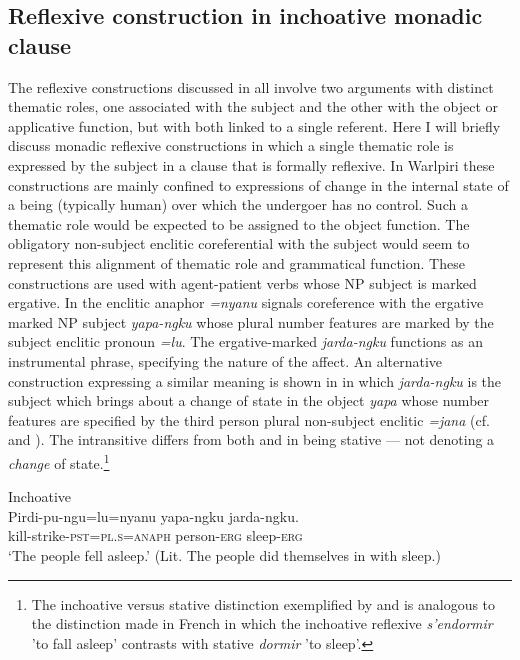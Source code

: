 \documentclass[output=paper]{../langscibook}
\begin{document}
\subsection{Reflexive construction in inchoative monadic clause}\label{sec:laughren:6.2}

The reflexive constructions discussed in  all involve two arguments with distinct thematic roles, one associated with the subject and the other with the object or applicative function, but with both linked to a single referent. Here I will briefly discuss monadic reflexive constructions in which a single thematic role is expressed by the subject in a clause that is formally reflexive. In Warlpiri these constructions are mainly confined to expressions of change in the internal state of a being (typically human) over which the undergoer has no control. Such a thematic role would be expected to be assigned to the object function. The obligatory non-subject enclitic coreferential with the subject would seem to represent this alignment of thematic role and grammatical function. These constructions are used with agent-patient verbs whose NP subject is marked ergative. In  the enclitic anaphor \textit{=nyanu} signals coreference with the ergative marked NP subject \textit{yapa-ngku} whose plural number features are marked by the subject enclitic pronoun \textit{=lu}. The ergative-marked \textit{jarda-ngku} functions as an instrumental phrase, specifying the nature of the affect. An alternative construction expressing a similar meaning is shown in  in which \textit{jarda-ngku} is the subject which brings about a change of state in the object \textit{yapa} whose number features are specified by the third person plural non-subject enclitic \textit{=jana} (cf.  and ). The intransitive  differs from both  and  in being stative — not denoting a \textit{change} of state.\footnote{\textrm{The inchoative versus stative distinction exemplified by  and  is analogous to the distinction made in French in which the inchoative reflexive} \textrm{\textit{s'endormir}} \textrm{'to fall asleep' contrasts with stative} \textrm{\textit{dormir} }\textrm{{}'to sleep'.}}

\ea%
    \label{ex:laughren:41}
\ea Inchoative\\
\label{ex:laughren:41a}
\gll Pirdi-pu-ngu=lu=nyanu  yapa-ngku  jarda-ngku. \\
    kill-strike-\textsc{pst=pl.s=anaph}  person-\textsc{erg}  sleep-\textsc{erg}\\
\glt `The people fell asleep.' (Lit. The people did themselves in with sleep.)
\end{document}
